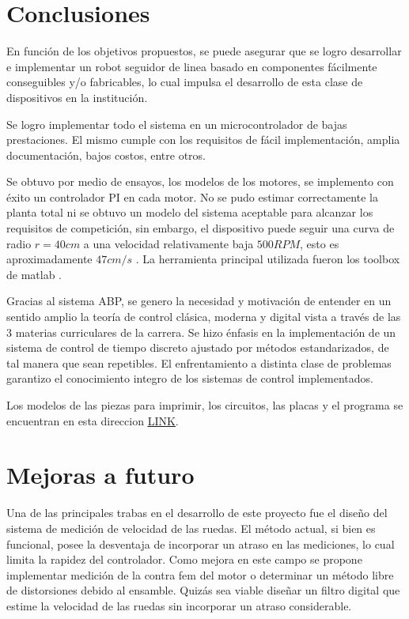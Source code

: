\documentclass[10pt,conference,a4paper,onecolumn]{article}%
\begin{document}
\section{Conclusiones}
\label{sec:conclusiones}
En función de los objetivos propuestos, se puede asegurar que se logro desarrollar e implementar un robot seguidor de linea basado en componentes fácilmente conseguibles y/o fabricables, lo cual impulsa el desarrollo de esta clase de dispositivos en la institución. 

Se logro implementar todo el sistema en un microcontrolador de bajas prestaciones. El mismo cumple con los requisitos de fácil implementación, amplia documentación, bajos costos, entre otros.  

Se obtuvo por medio de ensayos, los modelos de los motores, se implemento con éxito un controlador PI en cada motor. No se pudo estimar correctamente la planta total ni se obtuvo un modelo del sistema aceptable para alcanzar los requisitos de competición, sin embargo, el dispositivo puede seguir una curva de radio $r=40cm$ a una velocidad relativamente baja $500RPM$, esto es aproximadamente $47cm/s$ . La herramienta principal utilizada fueron los toolbox de matlab \cite{Sys_ident,PID_tuner}.



Gracias al sistema ABP, se genero la necesidad y motivación de entender en un sentido amplio  la teoría de control clásica, moderna y digital vista a través de las 3 materias curriculares de la carrera. Se hizo énfasis en la implementación de un sistema de control de tiempo discreto ajustado por métodos estandarizados, de tal manera que sean repetibles. El enfrentamiento a distinta clase de problemas garantizo el conocimiento integro de los sistemas de control implementados. %
 
Los modelos de las piezas para imprimir, los circuitos, las placas y el programa se encuentran en esta direccion \href{https://github.com/Seba-san/Trabajo_Final_Controlados/}{\underline{LINK}}.

  


\section{Mejoras a futuro}
Una de las principales trabas en el desarrollo de este proyecto fue el diseño del sistema de medición de velocidad de las ruedas. El método actual, si bien es funcional, posee la desventaja de incorporar un atraso en las mediciones, lo cual limita la rapidez del controlador. Como mejora en este campo se propone implementar medición de la contra fem del motor o determinar un método libre de distorsiones debido al ensamble. Quizás sea viable diseñar un filtro digital que estime la velocidad de las ruedas sin incorporar un atraso considerable. 
\end{document}
